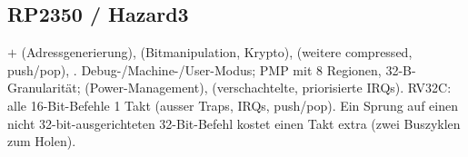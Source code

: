 \subsection{RP2350 / Hazard3}
 $+$  (Adressgenerierung),
 (Bitmanipulation, Krypto),
 (weitere compressed, push/pop), .
Debug-/Machine-/User-Modus; PMP mit 8 Regionen, 32-B-Granularität;
 (Power-Management),  (verschachtelte,
priorisierte IRQs).
RV32C: alle 16-Bit-Befehle 1 Takt (ausser Traps, IRQs, push/pop).
Ein Sprung auf einen nicht 32-bit-ausgerichteten 32-Bit-Befehl kostet
einen Takt extra (zwei Buszyklen zum Holen).
